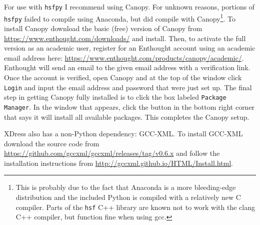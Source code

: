   For use with \texttt{hsfpy} I recommend using Canopy. For unknown reasons, portions of \texttt{hsfpy} failed to compile using Anaconda, but did compile with Canopy\footnote{This is probably due to the fact that Anaconda is a more bleeding-edge distribution and the included Python is compiled with a relatively new C compiler. Parts of the \texttt{hsf} C++ library are known not to work with the clang C++ compiler, but function fine when using gcc.}. To install Canopy download the basic (free) version of Canopy from \url{https://www.enthought.com/downloads/} and install. Then, to activate the full version as an academic user, register for an Enthought account using an academic email address here: \url{https://www.enthought.com/products/canopy/academic/}. Enthought will send an email to the given email address with a verification link. Once the account is verified, open Canopy and at the top of the window click \texttt{Login} and input the email address and password that were just set up. The final step in getting Canopy fully installed is to click the box labeled \texttt{Package Manager}. In the window that appears, click the button in the bottom right corner that says it will install all available packages. This completes the Canopy setup.

  XDress also has a non-Python dependency: GCC-XML. To install GCC-XML download the source code from \url{https://github.com/gccxml/gccxml/releases/tag/v0.6.x} and follow the installation instructions from \url{http://gccxml.github.io/HTML/Install.html}.
